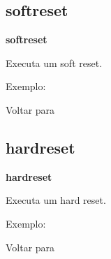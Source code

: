 \documentclass[letterpaper,10pt,brazil]{sphinxmanual}
\begin{document}
\subsection{softreset}
\label{debugger/general:softreset}\label{debugger/general:debugger-command-softreset}
\begin{DUlineblock}{0em}
\item[]
\begin{DUlineblock}{\DUlineblockindent}
\item[] \textbf{softreset}
\item[] 
\end{DUlineblock}
\item[] Executa um soft reset.
\item[] Exemplo:
\item[] 
\item[] 
\item[] 
\item[] 
\item[] Voltar para {\hyperref[debugger/general:debugger\string-general\string-list]{}}
\end{DUlineblock}
\begin{quote}
\label{debugger/general:debugger-command-hardreset}\end{quote}


\subsection{hardreset}
\label{debugger/general:debugger-command-hardreset}\label{debugger/general:hardreset}
\begin{DUlineblock}{0em}
\item[]
\begin{DUlineblock}{\DUlineblockindent}
\item[] \textbf{hardreset}
\item[] 
\end{DUlineblock}
\item[] Executa um hard reset.
\item[] Exemplo:
\item[] 
\item[] 
\item[] 
\item[] 
\item[] Voltar para {\hyperref[debugger/general:debugger\string-general\string-list]{}}
\end{DUlineblock}
\begin{quote}
\label{debugger/general:debugger-command-print}\end{quote}
\end{document}
